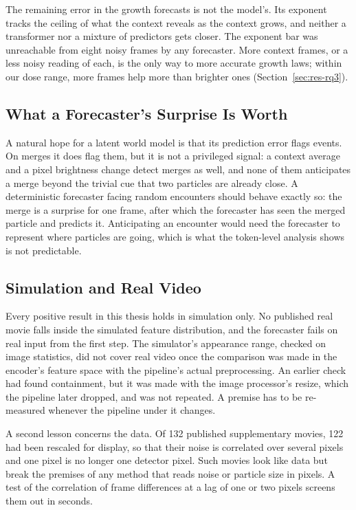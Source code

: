 The remaining error in the growth forecasts is not the model's. Its exponent tracks the
ceiling of what the context reveals as the context grows, and neither a transformer nor
a mixture of predictors gets closer. The exponent bar was unreachable from eight noisy
frames by any forecaster. More context frames, or a less noisy reading of each, is the
only way to more accurate growth laws; within our dose range, more frames help more than
brighter ones (Section~\ref{sec:res-rq3}).

\subsection{What a Forecaster's Surprise Is Worth}

A natural hope for a latent world model is that its prediction error flags events. On
merges it does flag them, but it is not a privileged signal: a context average and a pixel brightness
change detect merges as well, and none of them anticipates a merge beyond the trivial cue
that two particles are already close. A deterministic forecaster facing random encounters
should behave exactly so: the merge is a surprise for one frame, after which the
forecaster has seen the merged particle and predicts it. Anticipating an encounter would
need the forecaster to represent where particles are going, which is what the
token-level analysis shows is not predictable.

\subsection{Simulation and Real Video}

Every positive result in this thesis holds in simulation only. No published real movie
falls inside the simulated feature distribution, and the forecaster fails on real input
from the first step. The simulator's appearance range, checked on image statistics, did
not cover real video once the comparison was made in the encoder's feature space with
the pipeline's actual preprocessing. An earlier check had found containment, but it was
made with the image processor's resize, which the pipeline later dropped, and was not
repeated. A premise has to be re-measured whenever the pipeline under it changes.

A second lesson concerns the data. Of 132 published supplementary movies, 122 had been
rescaled for display, so that their noise is correlated over several pixels and one pixel
is no longer one detector pixel. Such movies look like data but break the premises of any
method that reads noise or particle size in pixels. A test of the correlation of frame
differences at a lag of one or two pixels screens them out in seconds.

